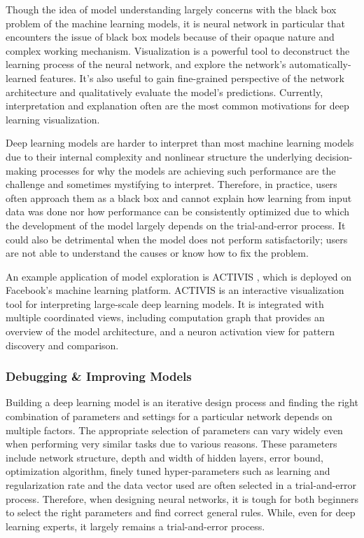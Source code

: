 Though the idea of model understanding largely concerns with the black box problem of the machine learning models, it is neural network in particular that encounters the issue of black box models because of their opaque nature and complex working mechanism. Visualization is a powerful tool to deconstruct the learning process of the neural network, and explore the network's automatically-learned features. It's also useful to gain fine-grained perspective of the network architecture and qualitatively evaluate the model’s predictions. Currently, interpretation and explanation often are the most common motivations for deep learning visualization.

Deep learning models are harder to interpret than most machine learning models due to their internal complexity and nonlinear structure \cite{Samek} the underlying decision-making processes for why the models are achieving such performance are the challenge and sometimes mystifying to interpret. Therefore, in practice, users often approach them as a black box and cannot explain how learning from input data was done nor how performance can be consistently optimized due to which the development of the model largely depends on the trial-and-error process. It could also be detrimental when the model does not perform satisfactorily; users are not able to understand the causes or know how to fix the problem.

An example application of model exploration is ACTIVIS \cite{8022871}, which is deployed on Facebook's machine learning platform. ACTIVIS is an interactive visualization tool for interpreting large-scale deep learning models. It is integrated with multiple coordinated views, including computation graph that provides an overview of the model architecture, and a neuron activation view for pattern discovery and comparison.

\subsubsection*{Debugging \& Improving Models}

Building a deep learning model is an iterative design process and finding the right combination of parameters and settings for a particular network depends on multiple factors. The appropriate selection of parameters can vary widely even when performing very similar tasks due to various reasons. These parameters include network structure, depth and width of hidden layers, error bound, optimization algorithm, finely tuned hyper-parameters such as learning and regularization rate and the data vector used are often selected in a trial-and-error process. Therefore, when designing neural networks, it is tough for both beginners to select the right parameters and find correct general rules. While, even for deep learning experts, it largely remains a trial-and-error process.

